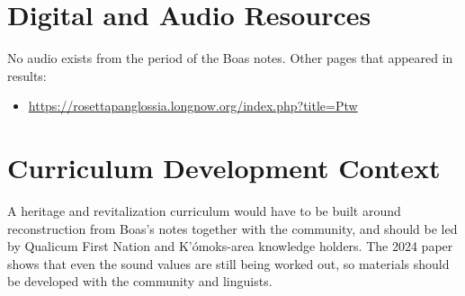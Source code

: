 \documentclass[12pt]{article}
\begin{document}
\section{Digital and Audio Resources}
No audio exists from the period of the Boas notes. Other pages that appeared in results:
\begin{itemize}
\item \url{https://rosettapanglossia.longnow.org/index.php?title=Ptw}
\end{itemize}

\section{Curriculum Development Context}
A heritage and revitalization curriculum would have to be built around reconstruction from Boas's notes together with the community, and should be led by Qualicum First Nation and K'\'omoks-area knowledge holders. The 2024 paper shows that even the sound values are still being worked out, so materials should be developed with the community and linguists.
\end{document}
